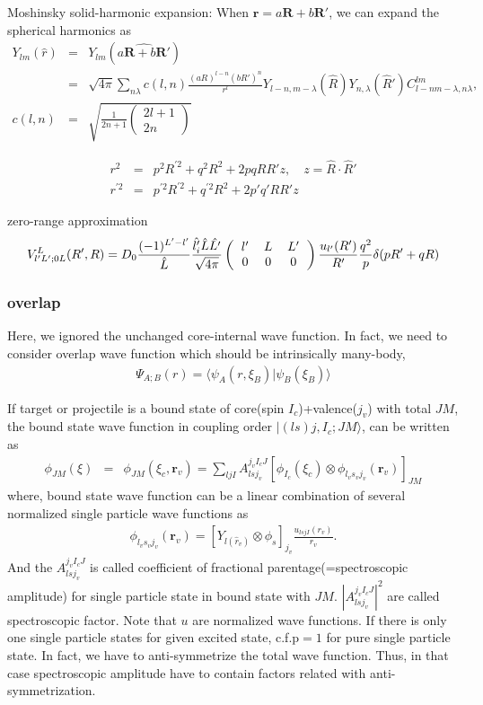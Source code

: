\documentclass[11pt]{book}
\def\bm{\boldsymbol}
\def\vr{{\bm r}}
\def\vR{{\bm R}}
\def\la{\langle}
\def\ra{\rangle}
\newcommand{\bea}{\begin{eqnarray}}
\newcommand{\eea}{\end{eqnarray}}
\newcommand{\no}{\nonumber \\}
\newcommand{\threejsymbol}[6]{\left(\begin{tabular}{ccc} {$#1$}&{$#2$}&{$#3$}\\
                             {$#4$}&{$#5$}&{$#6$}\end{tabular}\right)}
\begin{document}
Moshinsky solid-harmonic expansion:
When $\vr=a \vR+b \vR'$, we can expand the spherical harmonics as
\bea 
Y_{lm}(\hat{r})&=&Y_{lm}(\widehat{a \vR+b \vR'}) \no 
      &=&  \sqrt{4\pi} \sum_{n\lambda} 
           c(l,n) \frac{(aR)^{l-n}(bR')^n}{r^l} Y_{l-n,m-\lambda}(\hat{R})
           Y_{n,\lambda}(\hat{R}')
           C^{lm}_{l-n m-\lambda, n\lambda}, \no 
c(l,n)&=&\sqrt{\frac{1}{2n+1}\left(\begin{array}{c} 2l+1 \\ 2n \end{array} 
   \right) }            
\eea 

\bea 
r^2&=& p^2 R^{'2}+q^2 R^2+2 p q R R' z, \quad z=\hat{R}\cdot\hat{R}'\no 
r^{'2}&=& p^{'2} R^{'2}+q^{'2} R^2+2 p' q' R R' z
\eea 


zero-range approximation
\bea 
V^{L}_{l'L';0L}(R',R)=D_0\frac{(-1)^{L'-l'}}{\hat{L}} 
 \frac{\hat{l'_i}\hat{L}\hat{L'}}  {\sqrt{4\pi}}\threejsymbol{l'}{L}{L'}{0}{0}{0}
 \frac{u_{l'}(R')}{R'}
 \frac{q^2}{p}\delta(pR'+qR)  
\eea 

\subsubsection{overlap}

Here, we ignored the unchanged core-internal wave function. 
In fact, we need to consider overlap wave function which 
should be intrinsically many-body,
\bea 
\Psi_{A;B}(r)=\la \psi_A(r,\xi_B)|\psi_B(\xi_B)\ra 
\eea 


 
If target or projectile is a bound state of core(spin $I_c$)+valence($j_v$)
with total $JM$, the bound state wave function 
in coupling order $|(ls)j,I_c;JM\ra$,
can be written as
\bea 
\phi_{JM}(\xi)&=&\phi_{JM}(\xi_c,\vr_{v})
=\sum_{l j I} A^{j_v I_c J}_{l s j_v}
    [ \phi_{I_c}(\xi_c)\otimes \phi_{l_v s_v j_v}(\vr_v)]_{JM}
\eea 
where, bound state wave function can be a linear combination of 
several normalized single particle wave functions as
\bea 
\phi_{l_v s_v j_v}(\vr_v)
= [Y_{l(\hat{r}_v)}\otimes \phi_{s}]_{j_v}\frac{u_{lsjI}(r_v)}{r_v}.
\eea  
And the $A^{j_v I_c J}_{l s j_v}$ is called 
coefficient of fractional parentage(=spectroscopic amplitude) 
for single particle  state in bound state with $JM$. 
$|A^{j_v I_c J}_{l s j_v}|^2$ are called spectroscopic factor.
Note that $u$ are normalized wave functions. 
If there is only one single particle states
for given excited state, c.f.p$=1$ for pure single particle state. 
In fact, we have to anti-symmetrize the total wave function. Thus,
in that case spectroscopic amplitude have to contain factors related with 
anti-symmetrization. 
\end{document}
